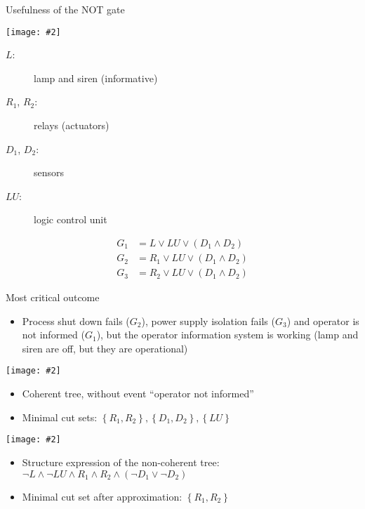 \documentclass{beamer}
\newcommand{\includegraphicsaspectratio}[2][1]{%
  \texttt{[image: \#2]}%
}
\begin{document}
\begin{frame}{Usefulness of the NOT gate}
	\begin{center}
		\begin{minipage}{0.6\textwidth}
			\includegraphicsaspectratio[1]{ft-generic-failure-gas-detection-system}
		\end{minipage}
		\begin{minipage}{0.39\textwidth}
			\footnotesize
			\begin{description}
				\item[$L$:] lamp and siren (informative)
				\item[$R_1$, $R_2$:] relays (actuators)
				\item[$D_1$, $D_2$:] sensors
				\item[$LU$:] logic control unit
			\end{description}
			\begin{align*}
				G_1 & = L \lor LU \lor \left(D_1 \land D_2\right)\\
				G_2 & = R_1 \lor LU \lor \left(D_1 \land D_2\right)\\
				G_3 & = R_2 \lor LU \lor \left(D_1 \land D_2\right)
			\end{align*}
		\end{minipage}
	\end{center}
\end{frame}

\begin{frame}{Most critical outcome}
	\footnotesize
	\begin{itemize}
		\item Process shut down fails ($G_2$), power supply isolation fails ($G_3$) and operator is not informed ($G_1$), but the operator information system is working (lamp and siren are off, but they are operational)
	\end{itemize}
	\begin{minipage}{0.38\textwidth}
		\footnotesize
		\includegraphicsaspectratio[0.95]{outcome-4-coherent-ft}
		\begin{itemize}
			\item Coherent tree, without event ``operator not informed''
			\item Minimal cut sets: $\left\{R_1, R_2\right\}, \left\{D_1, D_2\right\}, \left\{LU\right\} $
		\end{itemize}
	\end{minipage}
	\begin{minipage}{0.52\textwidth}
		\footnotesize
		\includegraphicsaspectratio[0.95]{outcome-4-non-coherent-ft}
		\begin{itemize}
			\item Structure expression of the non-coherent tree: $\lnot L \land \lnot LU \land R_1 \land R_2 \land \left(\lnot D_1 \lor \lnot D_2\right)$
			\item Minimal cut set after approximation: $\left\{R_1, R_2\right\} $
		\end{itemize}
	\end{minipage}
\end{frame}
\end{document}
